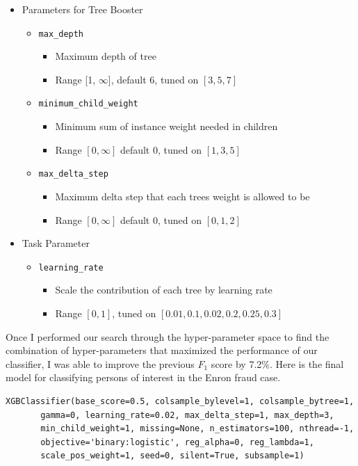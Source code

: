 \documentclass[titlepage,numbers=noenddot,headinclude,%
               footinclude=true,abstractoff,BCOR=5mm,%
               paper=a4,fontsize=11pt,ngerman,american]{scrreprt}
\numberwithin{theorem}{chapter}
\numberwithin{definition}{chapter}
\numberwithin{algorithm}{chapter}
\numberwithin{figure}{chapter}
\numberwithin{table}{chapter}
\numberwithin{equation}{chapter}
\begin{document}
\begin{itemize}
\item Parameters for Tree Booster
    \begin{itemize}
        \item \texttt{max\_depth}
        \begin{itemize}
            \item Maximum depth of tree
            \item Range [1, $\infty$], default 6, tuned on $[3,5,7]$
        \end{itemize}
        \item \texttt{minimum\_child\_weight}
        \begin{itemize}
            \item Minimum sum of instance weight needed in children
            \item Range $[0,\infty]$ default 0, tuned on $[1,3,5]$
        \end{itemize}
        \item \texttt{max\_delta\_step}
        \begin{itemize}
            \item Maximum delta step that each trees weight is allowed to be
            \item Range $[0, \infty]$ default 0, tuned on $[0, 1, 2]$
        \end{itemize}
    \end{itemize}

\item Task Parameter
    \begin{itemize}
        \item \texttt{learning\_rate}
        \begin{itemize}
            \item Scale the contribution of each tree by learning rate
            \item Range $[0, 1]$, tuned on $[0.01, 0.1, 0.02, 0.2, 0.25, 0.3]$
        \end{itemize}
    \end{itemize}
\end{itemize}

Once I performed our search through the hyper-parameter space to find the combination of hyper-parameters that maximized the performance of our classifier, I was able to improve the previous $F_1$ score by 7.2\%. Here is the final model for classifying persons of interest in the Enron fraud case.
\begin{verbatim}
XGBClassifier(base_score=0.5, colsample_bylevel=1, colsample_bytree=1,
       gamma=0, learning_rate=0.02, max_delta_step=1, max_depth=3,
       min_child_weight=1, missing=None, n_estimators=100, nthread=-1,
       objective='binary:logistic', reg_alpha=0, reg_lambda=1,
       scale_pos_weight=1, seed=0, silent=True, subsample=1)
\end{verbatim}
\end{document}
